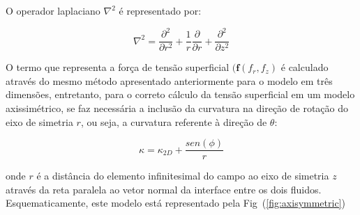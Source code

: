 \documentclass[a4paper,portuges,12pt]{article}
\begin{document}
O operador laplaciano $\nabla^2$ é representado por:

\begin{equation}
	\nabla^2 
	=
	\frac{\partial^2}{\partial r^2}
	+
	\frac{1}{r}
	\frac{\partial}{\partial r}
	+
	\frac{\partial^2}{\partial z^2}
\label{eq:laplacianAxi}
\end{equation}\vspace{0.5cm}

O termo que representa a força de tensão superficial
$(\mathbf{f}(f_r,f_z)$ é calculado através do mesmo método apresentado
anteriormente para o modelo em três dimensões, entretanto, para o
correto cálculo da tensão superficial em um modelo axissimétrico, se faz
necessária a inclusão da curvatura na direção de rotação do eixo de
simetria $r$, ou seja, a curvatura referente à direção de $\theta$:

\begin{equation}
	\kappa = \kappa_{2D} + \frac{sen(\phi)}{r}
\label{eq:curvAxi}
\end{equation}\vspace{0.5cm}

\noindent onde $r$ é a distância do elemento infinitesimal do campo ao
eixo de simetria $z$ através da reta paralela ao vetor normal da
interface entre os dois fluidos. Esquematicamente, este modelo está
representado pela Fig~(\ref{fig:axisymmetric})
\end{document}
